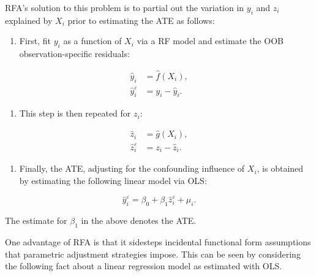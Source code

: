 \documentclass[11pt,]{article}
\providecommand{\tightlist}{%
\setlength{\itemsep}{0pt}\setlength{\parskip}{0pt}}
\begin{document}
RFA's solution to this problem is to partial out the variation in
\(y_i\) and \(z_i\) explained by \(X_i\) prior to estimating the ATE as
follows:

\begin{enumerate}
\def\labelenumi{\arabic{enumi}.}
\tightlist
\item
  First, fit \(y_i\) as a function of \(X_i\) via a RF model and
  estimate the OOB observation-specific residuals:
\end{enumerate}

\[
\begin{aligned}
\hat{y}_i & = \hat{f}(X_i), \\
\hat{y}_i^\varepsilon & = y_i - \hat{y}_i.
\end{aligned} \tag{2}
\]

\begin{enumerate}
\def\labelenumi{\arabic{enumi}.}
\setcounter{enumi}{1}
\tightlist
\item
  This step is then repeated for \(z_i\):
\end{enumerate}

\[
\begin{aligned}
\hat{z}_i & = \hat{g}(X_i), \\
\hat{z}_i^\varepsilon & = z_i - \hat{z}_i.
\end{aligned} \tag{3}
\]

\begin{enumerate}
\def\labelenumi{\arabic{enumi}.}
\setcounter{enumi}{2}
\tightlist
\item
  Finally, the ATE, adjusting for the confounding influence of \(X_i\),
  is obtained by estimating the following linear model via OLS:
\end{enumerate}

\[\hat{y}_i^\varepsilon = \beta_0 + \beta_1\hat{z}_i^\varepsilon + \mu_i.\tag{4}\]

The estimate for \(\beta_1\) in the above denotes the ATE.

One advantage of RFA is that it sidesteps incidental functional form
assumptions that parametric adjustment strategies impose. This can be
seen by considering the following fact about a linear regression model
as estimated with OLS.
\end{document}
